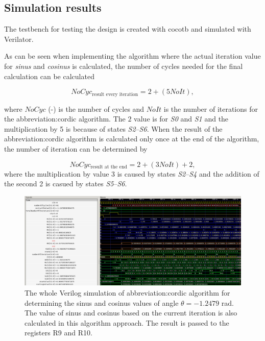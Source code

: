 \documentclass[a4paper, twoside, 11pt]{article}
\begin{document}
    \subsection{Simulation results}
    The testbench for testing the design is created with cocotb and simulated with Verilator.\par
    As can be seen when implementing the algorithm where the actual iteration value for \textit{sinus} and \textit{cosinus} is calculated, the number of cycles needed for the final calculation can be calculated

    \begin{equation}
        NoCyc_\text{result every iteration} = 2 + (5 NoIt),
    \end{equation}

    where $NoCyc$ (-) is the number of cycles and $NoIt$ is the number of iterations for the \gls{abbreviation:cordic} algorithm. The $2$ value is for \textit{S0} and \textit{S1} and the multiplication by 5 is because of states \textit{S2}–\textit{S6}. When the result of the \gls{abbreviation:cordic} algorithm is calculated only once at the end of the algorithm, the number of iteration can be determined by

    \begin{equation}
        NoCyc_\text{result at the end} = 2 + (3 NoIt) + 2,
    \end{equation}
    where the multiplication by value 3 is caused by states \textit{S2}–\textit{S4} and the addition of the second 2 is casued by states \textit{S5}–\textit{S6}.\par

        \begin{figure}[htbp!]
            \centering
            \includegraphics[width=1\textwidth]{src/png/cordic-verilog-whole-sim.png}
            \caption{The whole Verilog simulation of \gls{abbreviation:cordic} algorithm for determining the sinus and cosinus values of angle $\theta = -1.2479$ rad. The value of sinus and cosinus based on the current iteration is also calculated in this algorithm approach. The result is passed to the registers R9 and R10.}
            \label{fig:cordic-verilog-whole-sim}
        \end{figure}
\end{document}
